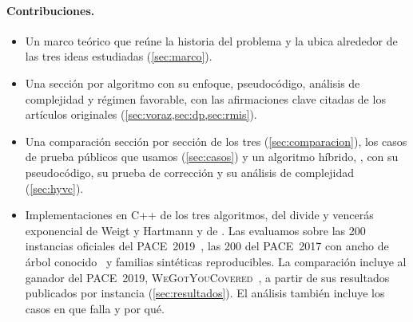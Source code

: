 \paragraph{Contribuciones.}
\begin{itemize}
  \item Un marco teórico que reúne la historia del problema y la ubica alrededor de las tres ideas estudiadas (\cref{sec:marco}).
  \item Una sección por algoritmo con su enfoque, pseudocódigo, análisis de complejidad y régimen favorable, con las afirmaciones clave citadas de los artículos originales (\cref{sec:voraz,sec:dp,sec:rmis}).
  \item Una comparación sección por sección de los tres (\cref{sec:comparacion}), los casos de prueba públicos que usamos (\cref{sec:casos}) y un algoritmo híbrido, \hyvc, con su pseudocódigo, su prueba de corrección y su análisis de complejidad (\cref{sec:hyvc}).
  \item Implementaciones en C++ de los tres algoritmos, del divide y vencerás exponencial de Weigt y Hartmann y de \hyvc. Las evaluamos sobre las 200 instancias oficiales del PACE~2019~\citep{pace2019data}, las 200 del PACE~2017 con ancho de árbol conocido~\citep{pace2017data} y familias sintéticas reproducibles. La comparación incluye al ganador del PACE~2019, \textsc{WeGotYouCovered}~\citep{hespe2020}, a partir de sus resultados publicados por instancia (\cref{sec:resultados}). El análisis también incluye los casos en que \hyvc{} falla y por qué.
\end{itemize}

